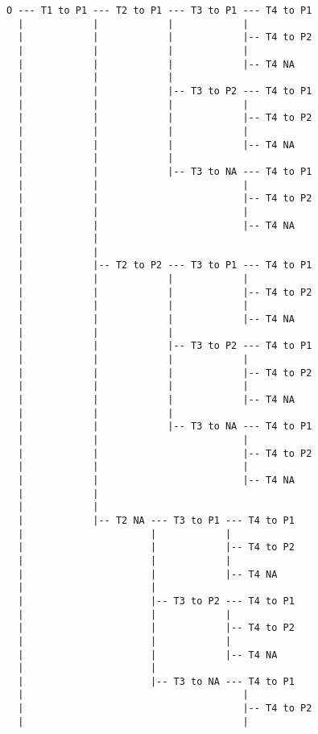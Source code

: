 \documentclass{article}
\begin{document}
\begin{enumerate}
\begin{enumerate}
			\begin{verbatim}
			O --- T1 to P1 --- T2 to P1 --- T3 to P1 --- T4 to P1
			  |            |            |            |
			  |            |            |            |-- T4 to P2
			  |            |            |            |
			  |            |            |            |-- T4 NA
			  |            |            |            
			  |            |            |-- T3 to P2 --- T4 to P1
			  |            |            |            |
			  |            |            |            |-- T4 to P2
			  |            |            |            |
			  |            |            |            |-- T4 NA
			  |            |            |
			  |            |            |-- T3 to NA --- T4 to P1
			  |            |                         |
			  |            |                         |-- T4 to P2
			  |            |                         |
			  |            |                         |-- T4 NA
			  |            |
			  |            |
			  |            |-- T2 to P2 --- T3 to P1 --- T4 to P1
			  |            |            |            |
			  |            |            |            |-- T4 to P2
			  |            |            |            |
			  |            |            |            |-- T4 NA
			  |            |            |            
			  |            |            |-- T3 to P2 --- T4 to P1
			  |            |            |            |
			  |            |            |            |-- T4 to P2
			  |            |            |            |
			  |            |            |            |-- T4 NA
			  |            |            |
			  |            |            |-- T3 to NA --- T4 to P1
			  |            |                         |
			  |            |                         |-- T4 to P2
			  |            |                         |
			  |            |                         |-- T4 NA
			  |            |
			  |            |
			  |            |-- T2 NA --- T3 to P1 --- T4 to P1
			  |                      |            |
			  |                      |            |-- T4 to P2
			  |                      |            |
			  |                      |            |-- T4 NA
			  |                      |            
			  |                      |-- T3 to P2 --- T4 to P1
			  |                      |            |
			  |                      |            |-- T4 to P2
			  |                      |            |
			  |                      |            |-- T4 NA
			  |                      |
			  |                      |-- T3 to NA --- T4 to P1
			  |                                      |
			  |                                      |-- T4 to P2
			  |                                      |

\end{verbatim}
\end{enumerate}
\end{enumerate}
\end{document}
